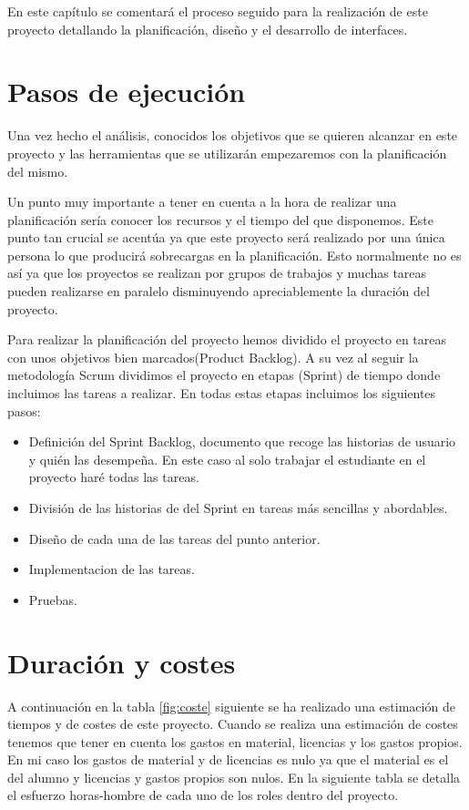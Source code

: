 

 En este capítulo se comentará el proceso seguido para la realización de este proyecto detallando la planificación, diseño y el desarrollo de interfaces.
 
\section{Pasos de ejecución}

Una vez hecho el análisis, conocidos los objetivos que se quieren alcanzar en este proyecto y las herramientas que se utilizarán  empezaremos con la planificación del mismo.

Un punto muy  importante a tener en cuenta a la hora de realizar una planificación sería conocer los recursos y el tiempo del que disponemos.
Este punto tan crucial se acentúa ya que este proyecto será realizado por una única persona lo que producirá sobrecargas en la planificación. Esto normalmente no es así ya que los proyectos se realizan por grupos de trabajos y muchas tareas pueden realizarse en paralelo disminuyendo apreciablemente la duración del proyecto.

Para realizar la planificación del proyecto hemos dividido el proyecto en tareas con unos objetivos bien marcados(Product Backlog). A su vez al seguir la metodología Scrum dividimos el proyecto en etapas (Sprint) de tiempo donde incluimos las tareas a realizar.
 En todas estas etapas incluimos los siguientes pasos:
 
 


\begin{itemize}
\item Definición del Sprint Backlog,  documento que recoge las historias de usuario y quién las desempeña. En este caso al solo trabajar el estudiante en el proyecto haré todas las tareas.


\item División de las historias de del Sprint en tareas más sencillas y abordables. 



\item Diseño de cada una de las tareas del punto anterior.
\item  Implementacion de las tareas.
\item Pruebas.
\end{itemize}



\section{Duración  y costes}
 A continuación en la tabla \ref{fig:coste} siguiente se ha realizado una estimación de tiempos y de costes de este proyecto.
 Cuando se realiza una estimación de costes tenemos que tener en cuenta los gastos en material, licencias y los gastos propios. En mi caso los gastos de material y de licencias es nulo ya que el material es el del alumno y licencias y gastos propios son nulos.
 En la siguiente tabla se detalla el esfuerzo horas-hombre de cada uno de los roles dentro del proyecto. 
 
